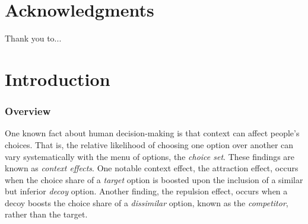 \documentclass{umassthesis}          %
\begin{document}
\chapter{Acknowledgments}             %
Thank you to...

\begin{abstract}                %

\end{abstract}



\tableofcontents                %
\listoftables                   %
\listoffigures                  %


\mainmatter   %



\chapter{Introduction}

\subsection{Overview}

One known fact about human decision-making is that context can affect people's choices. That is, the relative likelihood of choosing one option over another can vary systematically with the menu of options, the \textit{choice set}. These findings are known as \textit{context effects}. One notable context effect, the attraction effect, occurs when the choice share of a \textit{target} option is boosted upon the inclusion of a similar but inferior \textit{decoy} option. Another finding, the repulsion effect, occurs when a decoy boosts the choice share of a \textit{dissimilar} option, known as the \textit{competitor}, rather than the target.
\end{document}
